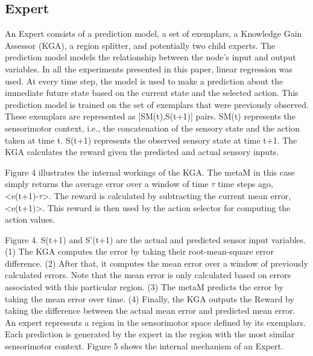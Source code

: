 \subsection{Expert}

An Expert consists of a prediction model, a set of exemplars, a Knowledge Gain Assessor (KGA), a region splitter, and potentially two child experts. 
The prediction model models the relationship between the node's input and output variables. In all the experiments presented in this paper, linear regression was used. At every time step, the model is used to make a prediction about the immediate future state based on the current state and the selected action. This prediction model is trained on the set of exemplars that were previously observed. These exemplars are represented as [SM(t),S(t+1)] pairs. SM(t) represents the sensorimotor context, i.e., the concatenation of the sensory state and the action taken at time t. S(t+1) represents the observed sensory state at time t+1. The KGA calculates the reward given the predicted and actual sensory inputs. 

Figure 4 illustrates the internal workings of the KGA. The metaM in this case simply returns the average error over a window of time \(\tau\) time steps ago, <e(t+1)-\(\tau\)>. The reward is calculated by subtracting the current mean error, <e(t+1)>. This reward is then used by the action selector for computing the action values. 

Figure 4.	S(t+1) and S'(t+1) are the actual and predicted sensor input variables. (1) The KGA computes the error by taking their root-mean-square error difference. (2) After that, it computes the mean error over a window of previously calculated errors. Note that the mean error is only calculated based on errors associated with this particular region. (3) The metaM predicts the error by taking the mean error over time. (4) Finally, the KGA outputs the Reward by taking the difference between the actual mean error and predicted mean error.
An expert represents a region in the sensorimotor space defined by its exemplars. Each prediction is generated by the expert in the region with the most similar sensorimotor context. Figure 5 shows the internal mechanism of an Expert.

